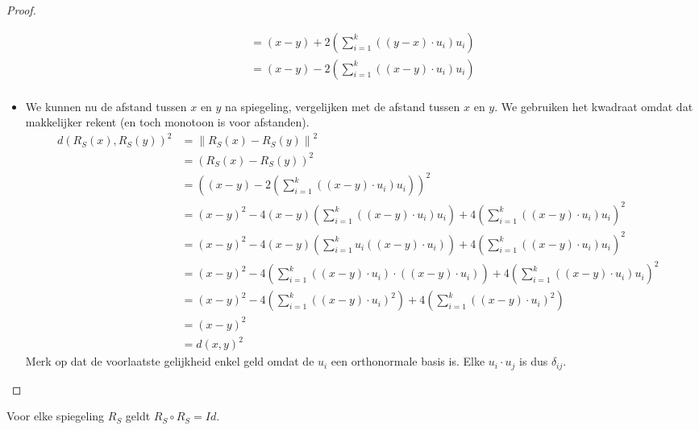\documentclass[main.tex]{subfiles}
\begin{document}
\begin{st}
\begin{proof}
\begin{itemize}
\[\begin{array}{rll}
                           &= (x-y) + 2\left(\sum_{i=1}^{k}((y-x)\cdot u_{i} )u_{i}\right) &\\
                           &= (x-y) - 2\left(\sum_{i=1}^{k}((x-y)\cdot u_{i} )u_{i}\right) &\\
      \end{array}
      \]
    \item We kunnen nu de afstand tussen $x$ en $y$ na spiegeling, vergelijken met de afstand tussen $x$ en $y$.
      We gebruiken het kwadraat omdat dat makkelijker rekent (en toch monotoon is voor afstanden).
      \[
      \begin{array}{rll}
        d(R_{S}(x),R_{S}(y))^{2} &= \left\| R_{S}(x) - R_{S}(y)\right\|^{2} & \\
                            &= (R_{S}(x) - R_{S}(y))^{2} &\\
                            &= \left((x-y) - 2\left(\sum_{i=1}^{k}((x-y)\cdot u_{i} )u_{i}\right)\right)^{2} &\\
                            &= (x-y)^{2} -4(x-y)\left(\sum_{i=1}^{k}((x-y)\cdot u_{i} )u_{i}\right) + 4\left(\sum_{i=1}^{k}((x-y)\cdot u_{i} )u_{i}\right)^{2} &\\
                            &= (x-y)^{2} -4(x-y)\left(\sum_{i=1}^{k}u_{i}((x-y)\cdot u_{i} )\right) + 4\left(\sum_{i=1}^{k}((x-y)\cdot u_{i} )u_{i}\right)^{2} &\\
                            &= (x-y)^{2} -4\left(\sum_{i=1}^{k}((x-y) \cdot u_{i})\cdot((x-y)\cdot u_{i} )\right) + 4\left(\sum_{i=1}^{k}((x-y)\cdot u_{i} )u_{i}\right)^{2} &\\
                            &= (x-y)^{2} -4\left(\sum_{i=1}^{k}((x-y)\cdot u_{i} )^{2}\right) + 4\left(\sum_{i=1}^{k}((x-y)\cdot u_{i} )^{2}\right) &\\
                            &= (x-y)^{2}\\
                            &= d(x,y)^{2}
      \end{array}
      \]
      Merk op dat de voorlaatste gelijkheid enkel geld omdat de $u_{i}$ een orthonormale basis is.
      Elke $u_{i}\cdot u_{j}$ is dus $\delta_{ij}$.
      
    \end{itemize}
  \end{proof}
\end{st}

\begin{st}
  Voor elke spiegeling $R_{S}$ geldt $R_{S} \circ R_{S} = Id$.
\end{st}
\end{document}

